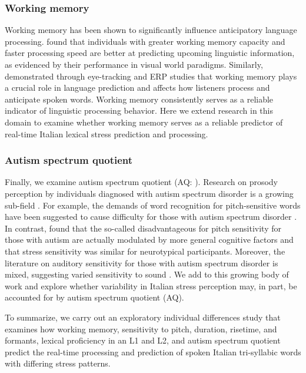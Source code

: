 \subsubsection{Working memory}
Working memory has been shown to significantly influence anticipatory language processing. \cite{Huettig2016} found that individuals with greater working memory capacity and faster processing speed are better at predicting upcoming linguistic information, as evidenced by their performance in visual world paradigms. Similarly, \cite{Li2023} demonstrated through eye-tracking and ERP studies that working memory plays a crucial role in language prediction and affects how listeners process and anticipate spoken words. Working memory consistently serves as a reliable indicator of linguistic processing behavior\citep{mchaney_et_al_2021_workingmemory, goss_2014, hadar_2016}. Here we extend research in this domain to examine whether working memory serves as a reliable predictor of real-time Italian lexical stress prediction and processing.


\subsubsection{Autism spectrum quotient}
Finally, we examine autism spectrum quotient (AQ: \cite{Baron-Cohen2001}). Research on prosody perception by individuals diagnosed with autism spectrum disorder is a growing sub-field \citep[see ][]{Grice2023, Paul2005, McCann2003}. For example, the demands of word recognition for pitch-sensitive words have been suggested to cause difficulty for those with autism spectrum disorder \citep{schelinski2020speech}. In contrast, \cite{grossman2023relationship} found that the so-called disadvantageous for pitch sensitivity for those with autism are actually modulated by more general cognitive factors and that stress sensitivity was similar for neurotypical participants. Moreover, the literature on auditory sensitivity for those with autism spectrum disorder is mixed, suggesting varied sensitivity to sound \citep{Kuiper2019, Stiegler2010}. We add to this growing body of work and explore whether variability in Italian stress perception may, in part, be accounted for by autism spectrum quotient (AQ). 

To summarize, we carry out an exploratory individual differences study that examines how working memory, sensitivity to pitch, duration, risetime, and formants, lexical proficiency in an L1 and L2, and autism spectrum quotient predict the real-time processing and prediction of spoken Italian tri-syllabic words with differing stress patterns.

